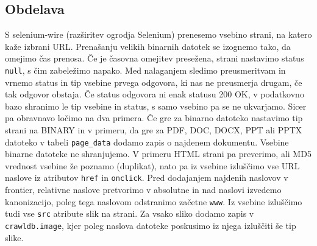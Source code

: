 \documentclass[a4paper,10pt]{paper}
\def\code#1{\texttt{#1}}
\begin{document}
\subsection{Obdelava}
S selenium-wire (razširitev ogrodja Selenium) prenesemo vsebino strani, na katero kaže izbrani URL. Prenašanju velikih binarnih datotek se izognemo tako, da omejimo čas prenosa. Če je časovna omejitev presežena, strani nastavimo status \code{null}, s čim zabeležimo napako. Med nalaganjem sledimo preusmeritvam in vrnemo status in tip vsebine prvega odgovora, ki nas ne preusmerja drugam, če tak odgovor obstaja. Če status odgovora ni enak statusu 200 OK, v podatkovno bazo shranimo le tip vsebine in status, s samo vsebino pa se ne ukvarjamo. Sicer pa obravnavo ločimo na dva primera. Če gre za binarno datoteko nastavimo tip strani na BINARY in v primeru, da gre za PDF, DOC, DOCX, PPT ali PPTX datoteko v tabeli \code{page\_data} dodamo zapis o najdenem dokumentu. Vsebine binarne datoteke ne shranjujemo. V primeru HTML strani pa preverimo, ali MD5 vrednost vsebine že poznamo (duplikat), nato pa iz vsebine izluščimo vse URL naslove iz atributov \code{href} in \code{onclick}. Pred dodajanjem najdenih naslovov v frontier, relativne naslove pretvorimo v absolutne in nad naslovi izvedemo kanonizacijo, poleg tega naslovom odstranimo začetne \code{www}. Iz vsebine izluščimo tudi vse \code{src} atribute slik na strani. Za vsako sliko dodamo zapis v \code{crawldb.image}, kjer poleg naslova datoteke poskusimo iz njega izluščiti še tip slike.
\end{document}

